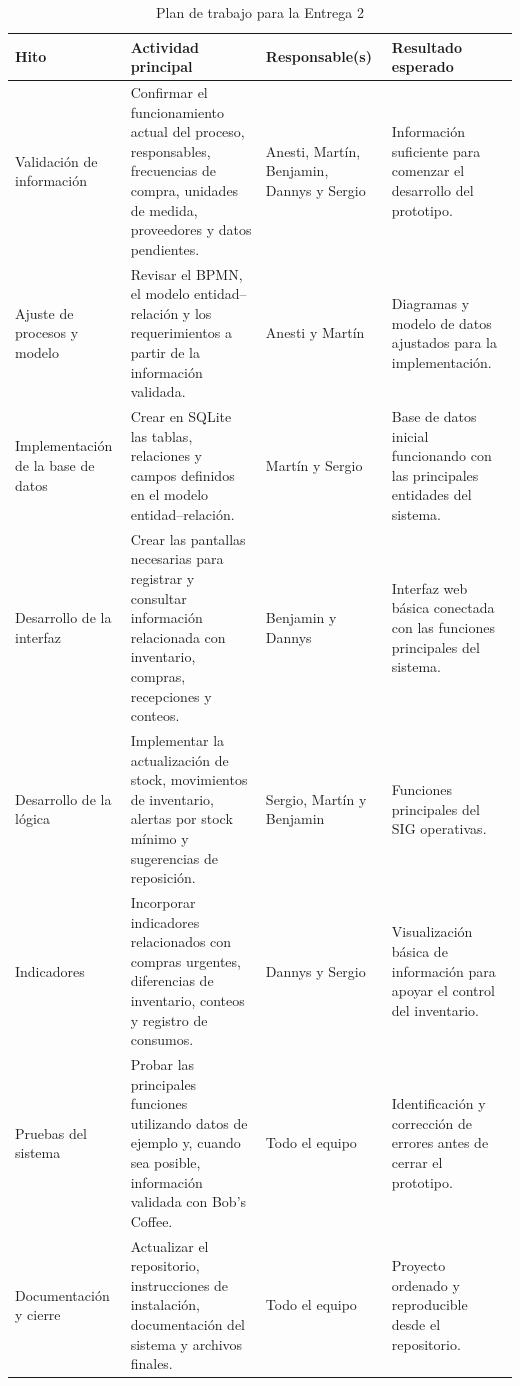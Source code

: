 \documentclass[11pt,letterpaper]{article}
\begin{document}
\begin{table}[H]
\centering
\caption{Plan de trabajo para la Entrega 2}
\begin{tabularx}{\textwidth}{p{}Xp{}X}
\toprule
\textbf{Hito} & \textbf{Actividad principal} & \textbf{Responsable(s)} & \textbf{Resultado esperado} \\
\midrule

Validación de información &
Confirmar el funcionamiento actual del proceso, responsables, frecuencias de compra, unidades de medida, proveedores y datos pendientes. &
Anesti, Martín, Benjamin, Dannys y Sergio &
Información suficiente para comenzar el desarrollo del prototipo. \\

Ajuste de procesos y modelo &
Revisar el BPMN, el modelo entidad--relación y los requerimientos a partir de la información validada. &
Anesti y Martín &
Diagramas y modelo de datos ajustados para la implementación. \\

Implementación de la base de datos &
Crear en SQLite las tablas, relaciones y campos definidos en el modelo entidad--relación. &
Martín y Sergio &
Base de datos inicial funcionando con las principales entidades del sistema. \\

Desarrollo de la interfaz &
Crear las pantallas necesarias para registrar y consultar información relacionada con inventario, compras, recepciones y conteos. &
Benjamin y Dannys &
Interfaz web básica conectada con las funciones principales del sistema. \\

Desarrollo de la lógica &
Implementar la actualización de stock, movimientos de inventario, alertas por stock mínimo y sugerencias de reposición. &
Sergio, Martín y Benjamin &
Funciones principales del SIG operativas. \\

Indicadores &
Incorporar indicadores relacionados con compras urgentes, diferencias de inventario, conteos y registro de consumos. &
Dannys y Sergio &
Visualización básica de información para apoyar el control del inventario. \\

Pruebas del sistema &
Probar las principales funciones utilizando datos de ejemplo y, cuando sea posible, información validada con Bob’s Coffee. &
Todo el equipo &
Identificación y corrección de errores antes de cerrar el prototipo. \\

Documentación y cierre &
Actualizar el repositorio, instrucciones de instalación, documentación del sistema y archivos finales. &
Todo el equipo &
Proyecto ordenado y reproducible desde el repositorio. \\

\bottomrule
\end{tabularx}
\end{table}
\end{document}

